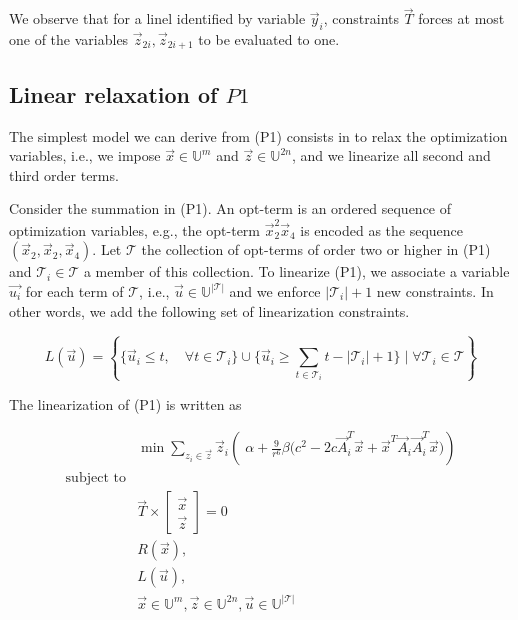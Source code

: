 We observe that for a linel identified by variable $\vec{y}_i$, constraints $\vec{T}$ forces at most one of the variables $\vec{z}_{2i},\vec{z}_{2i+1}$ to be evaluated to one. 


\subsection{Linear relaxation of $P1$}
\label{ch6:subsec:linear-relaxation}

	The simplest model we can derive from (P1) consists in to relax the optimization variables, i.e., we impose $\vec{x} \in \mathbb{U}^m$ and $\vec{z} \in \mathbb{U}^{2n}$, and we linearize all second and third order terms. 
	
	Consider the summation in (P1). An opt-term is an ordered sequence of optimization variables, e.g., the opt-term $\vec{x}_2^2\vec{x}_4$ is encoded as the sequence $(\vec{x}_2,\vec{x}_2,\vec{x}_4)$. Let $\mathcal{T}$ the collection of opt-terms of order two or higher in (P1) and $\mathcal{T}_i \in \mathcal{T}$ a member of this collection. To linearize (P1), we associate a variable $\vec{u_i}$ for each term of $\mathcal{T}$, i.e., $\vec{u} \in \mathbb{U}^{|\mathcal{T}|}$ and we enforce $|\mathcal{T}_i|+1$ new constraints. In other words, we add the following set of linearization constraints.
	
\[
	L(\vec{u}) = \left\{ \Big\{ \vec{u}_i \leq t, \quad \forall t \in \mathcal{T}_i \Big\} \cup \Big\{ \vec{u}_i \geq \displaystyle \sum_{t \in \mathcal{T}_i}{t} - |\mathcal{T}_i| + 1 \Big\} \; \Big| \; \forall \mathcal{T}_i \in \mathcal{T} \right\}
\]

The linearization of (P1) is written as

\[
\begin{array}{ll}
& \displaystyle	\min \sum_{z_i \in \vec{z}}{ \vec{z}_i \left(\; \alpha + \frac{9}{r^6}\beta \big(c^2 - 2c\vec{A}_i^T\vec{x} + \vec{x}^T\vec{A}_i\vec{A}_i^T\vec{x}\big)\right)} \\
\text{subject to}\\
&	\vec{T} \times  \left[ \begin{array}{c}
							\vec{x} \\ 
							\vec{z} 
						   \end{array} \right] = 0 \\
&   R(\vec{x}),\\
&   L(\vec{u}),\\
&   \vec{x} \in \mathbb{U}^{m}, \vec{z} \in \mathbb{U}^{2n}, \vec{u} \in \mathbb{U}^{|\mathcal{T}|} 
\end{array}
\]

